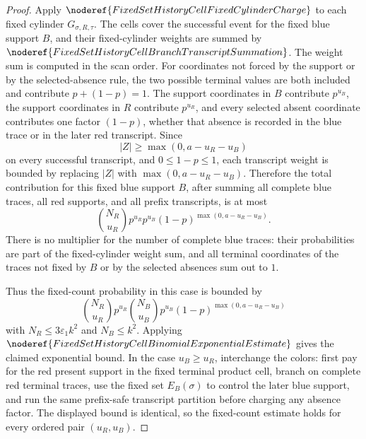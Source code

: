 \begin{proof}
Apply \(\noderef{FixedSetHistoryCellFixedCylinderCharge}\) to each fixed
cylinder \(G_{\sigma,R,\tau}\).  The cells cover the successful event for
the fixed blue support \(B\), and their fixed-cylinder weights are summed by
\(\noderef{FixedSetHistoryCellBranchTranscriptSummation}\).  The weight sum
is computed in the scan order.  For coordinates not forced by the support or
by the selected-absence rule, the two possible terminal values are both
included and contribute \(p+(1-p)=1\).  The support coordinates in \(B\)
contribute \(p^{u_B}\), the support coordinates in \(R\) contribute
\(p^{u_R}\), and every selected absent coordinate contributes one factor
\((1-p)\), whether that absence is recorded in the blue trace or in the later
red transcript.  Since
\[
|Z|\ge\max(0,a-u_R-u_B)
\]
on every successful transcript, and \(0\le1-p\le1\), each transcript weight
is bounded by replacing \(|Z|\) with \(\max(0,a-u_R-u_B)\).  Therefore the
total contribution for this fixed blue support \(B\), after summing all
complete blue traces, all red supports, and all prefix transcripts, is at
most
\[
\binom{N_R}{u_R}p^{u_R}p^{u_B}
(1-p)^{\max(0,a-u_R-u_B)}.
\]
There is no multiplier for the number of complete blue traces: their
probabilities are part of the fixed-cylinder weight sum, and all terminal
coordinates of the traces not fixed by \(B\) or by the selected absences sum
out to \(1\).

Thus the fixed-count probability in this case is bounded by
\[
\binom{N_R}{u_R}p^{u_R}
\binom{N_B}{u_B}p^{u_B}
(1-p)^{\max(0,a-u_R-u_B)}
\]
with \(N_R\le3\varepsilon_1k^2\) and \(N_B\le k^2\).  Applying
\(\noderef{FixedSetHistoryCellBinomialExponentialEstimate}\) gives the
claimed exponential bound.  In the case \(u_B\ge u_R\), interchange the
colors: first pay for the red present support in the fixed terminal product
cell, branch on complete red terminal traces, use the fixed set
\(E_B(\sigma)\) to control the later blue support, and run the same
prefix-safe transcript partition before charging any absence factor.  The
displayed bound is identical, so the fixed-count estimate holds for every
ordered pair \((u_R,u_B)\).
\end{proof}
